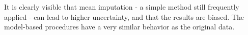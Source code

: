 \documentclass{scrartcl}\usepackage[]{graphicx}\usepackage[]{color}
\begin{document}
It is clearly visible that mean imputation - a simple method still frequently
applied - can lead to higher uncertainty,
and that the results are biased.
The model-based procedures have a very similar behavior as the original data.





\begin{figure}[h]
\begin{center}
%
%

\end{center}
\end{figure}
\end{document}
